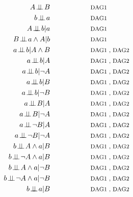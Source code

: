 \documentclass[
  10pt,
  dvipsnames,enabledeprecatedfontcommands]{scrartcl}
\newcommand{\indep}{\!\perp \!\!\! \perp\!}
\newcommand{\n}{\neg}
\newcommand{\et}{\wedge}
\begin{document}
\begin{align} A\indep B  \label{eq:indAB}     &\hspace{2cm}\mbox{\footnotesize DAG1}\\
b \indep a   \label{eq:indab}   & \hspace{2cm}\mbox{\footnotesize DAG1}\\
A \indep b \vert a   \label{eq:I1}    &\hspace{2cm}\mbox{\footnotesize DAG1} \\
B \indep a \et A \vert b \label{eq:I2}&\hspace{2cm}\mbox{\footnotesize DAG1 } \\
a\indep b \vert A\et B \label{eq:I3}  &\hspace{2cm}\mbox{\footnotesize DAG1 , DAG2} \\  
a\indep b \vert A \label{eq:I3a}   &\hspace{2cm}\mbox{\footnotesize DAG1 , DAG2} \\ 
a\indep b \vert \n A \label{eq:I3b}   &\hspace{2cm}\mbox{\footnotesize DAG1 , DAG2} \\ 
a\indep b \vert B \label{eq:I3a2}   &\hspace{2cm}\mbox{\footnotesize DAG1 , DAG2} \\ 
a\indep b \vert \n B \label{eq:I3b2}   &\hspace{2cm}\mbox{\footnotesize DAG1 , DAG2} \\ 
a\indep B \vert A \label{eq:I4}    & \hspace{2cm}\mbox{\footnotesize DAG1 , DAG2} \\
a\indep B \vert \n A \label{eq:I4a}    & \hspace{2cm}\mbox{\footnotesize DAG1 , DAG2} \\
a\indep \n B \vert A \label{eq:I4b}   & \hspace{2cm}\mbox{\footnotesize DAG1 , DAG2} \\
a\indep \n B \vert \n A \label{eq:I4c}   & \hspace{2cm}\mbox{\footnotesize DAG1 , DAG2} \\
b\indep A \et a \vert B \label{eq:I5}  & \hspace{2cm}\mbox{\footnotesize DAG1 , DAG2} \\
b\indep \n A \et a \vert B \label{eq:I5a} &\hspace{2cm}\mbox{\footnotesize DAG1 , DAG2}  \\
b\indep A \et a \vert \n B \label{eq:I5b} & \hspace{2cm}\mbox{\footnotesize DAG1 , DAG2} \\
b\indep \n A \et a \vert \n B \label{eq:I5c} & \hspace{2cm}\mbox{\footnotesize DAG1 , DAG2} \\
b \indep a \vert B \label{eq:I6} & \hspace{2cm}\mbox{\footnotesize DAG1 , DAG2} 
\end{align}
\end{document}
